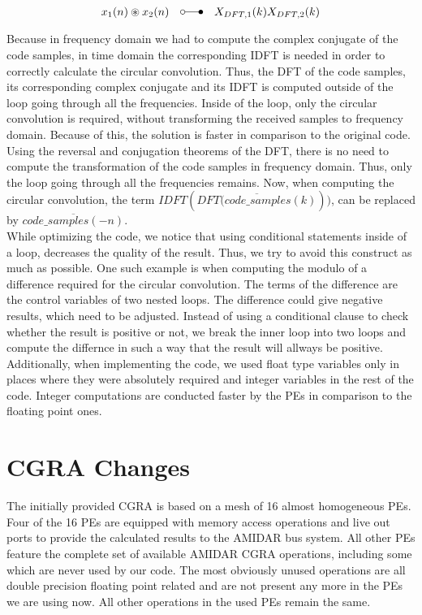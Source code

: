 			\begin{equation} 
				\label{eq:circular_conv}
				x_{1}(n) \circledast x_{2}(n)\quad \laplace\quad X_{DFT,1}(k)X_{DFT,2}(k)
			\end{equation} 

			Because in frequency domain we had to compute the complex conjugate of the code samples, in time domain the corresponding IDFT is needed in order to correctly calculate the circular convolution. Thus, the DFT of the code samples, its corresponding complex conjugate and its IDFT is computed outside of the loop going through all the frequencies. Inside of the loop, only the circular convolution is required, without transforming the received samples to frequency domain. Because of this, the solution is faster in comparison to the original code.\\
			Using the reversal and conjugation theorems of the DFT, there is no need to compute the transformation of the code samples in frequency domain. Thus, only the loop going through all the frequencies remains. Now, when computing the circular convolution, the term $IDFT(\overline{DFT(code\_samples(k)}))$, can be replaced by $\overline{code\_samples(-n)}$.\\ 
			While optimizing the code, we notice that using conditional statements inside of a loop, decreases the quality of the result. Thus, we try to avoid this construct as much as possible. One such example is when computing the modulo of a difference required for the circular convolution. The terms of the difference are the control variables of two nested loops. The difference could give negative results, which need to be adjusted. Instead of using a conditional clause to check whether the result is positive or not, we break the inner loop into two loops and compute the differnce in such a way that the result will allways be positive.\\
			Additionally, when implementing the code, we used float type variables only in places where they were absolutely required and integer variables in the rest of the code. Integer computations are conducted faster by the PEs in comparison to the floating point ones. 

	\section{CGRA Changes} %
	\label{sec:cgra_changes}
		The initially provided CGRA is based on a mesh of \num{16} almost homogeneous PEs. Four of the \num{16} PEs are equipped with memory access operations and live out ports to provide the calculated results to the AMIDAR bus system. All other PEs feature the complete set of available AMIDAR CGRA operations, including some which are never used by our code. The most obviously unused operations are all double precision floating point related and are not present any more in the PEs we are using now. All other operations in the used PEs remain the same.\newline
		
